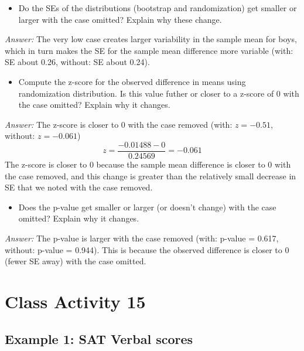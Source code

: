 \documentclass[
]{book}
\providecommand{\tightlist}{%
  \setlength{\itemsep}{0pt}\setlength{\parskip}{0pt}}
\begin{document}
\vspace*{.5in}

\begin{itemize}
\tightlist
\item
  Do the SEs of the distributions (bootstrap and randomization) get smaller or larger with the case omitted? Explain why these change.
\end{itemize}

\emph{Answer:} The very low case creates larger variability in the sample mean for boys, which in turn makes the SE for the sample mean difference more variable (with: SE about 0.26, without: SE about 0.24).

\vspace*{.5in}

\begin{itemize}
\tightlist
\item
  Compute the z-score for the observed difference in means using randomization distribution. Is this value futher or closer to a z-score of 0 with the case omitted? Explain why it changes.
\end{itemize}

\emph{Answer:} The z-score is closer to 0 with the case removed (with: \(z = -0.51\), without: \(z = -0.061\))
\[
z = \dfrac{-0.01488  - 0}{0.24569} = -0.061
\]
The z-score is closer to 0 because the sample mean difference is closer to 0 with the case removed, and this change is greater than the relatively small decrease in SE that we noted with the case removed.

\vspace*{.5in}

\begin{itemize}
\tightlist
\item
  Does the p-value get smaller or larger (or doesn't change) with the case omitted? Explain why it changes.
\end{itemize}

\emph{Answer:} The p-value is larger with the case removed (with: p-value = 0.617, without: p-value = 0.944). This is because the observed difference is closer to 0 (fewer SE away) with the case omitted.

\hypertarget{class-activity-15}{%
\chapter{Class Activity 15}\label{class-activity-15}}

\hypertarget{example-1-sat-verbal-scores}{%
\section{Example 1: SAT Verbal scores}\label{example-1-sat-verbal-scores}}
\end{document}
